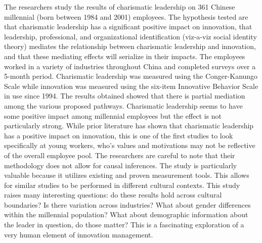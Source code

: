 \begin{adjustwidth}{1in}{}
  \begin{hangpara}{.25in}{1}
\end{hangpara}
\end{adjustwidth}
The researchers study the results of charismatic leadership on 361 Chinese millennial (born between 1984 and 2001) employees. The hypothesis tested are that charismatic leadership has a significant positive impact on innovation, that leadership, professional, and organizational identification (viz-a-viz social identity theory) mediates the relationship between charismatic leadership and innovation, and that these mediating effects will serialize in their impacts. The employees worked in a variety of industries throughout China and completed surveys over a 5-month period. Charismatic leadership was measured using the Conger-Kanungo Scale while innovation was measured using the six-item Innovative Behavior Scale in use since 1994. The results obtained showed that there is partial mediation among the various proposed pathways. Charismatic leadership seems to have some positive impact among millennial employees but the effect is not particularly strong.  While prior literature has shown that charismatic leadership has a positive impact on innovation, this is one of the first studies to look specifically at young workers, who's values and motivations may not be reflective of the overall employee pool. The researchers are careful to note that their methodology does not allow for causal inferences. The study is particularly valuable because it utilizes existing and proven measurement tools. This allows for similar studies to be performed in different cultural contexts. This study raises many interesting questions: do these results hold across cultural boundaries? Is there variation across industries? What about gender differences within the millennial population? What about demographic information about the leader in question, do those matter? This is a fascinating exploration of a very human element of innovation management.


